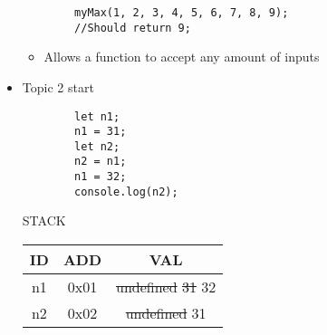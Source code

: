 \documentclass{article}
\begin{document}
\begin{itemize}
\begin{lstlisting}
        myMax(1, 2, 3, 4, 5, 6, 7, 8, 9);
        //Should return 9;
    \end{lstlisting}
    \begin{itemize}
        \item Allows a function to accept any amount of inputs
    \end{itemize}
    \item Topic 2 start
    \begin{lstlisting}
        let n1;
        n1 = 31;
        let n2;
        n2 = n1;
        n1 = 32;
        console.log(n2);
    \end{lstlisting}
    \begin{center}
        STACK
    \begin{tabular}{|c|c|c|}
        \hline ID & ADD & VAL  \\
        \hline\hline
        n1 & 0x01 & \st{undefined} \st{31} 32 \\
        n2 & 0x02 & \st{undefined} 31 \\
        \hline    
    \end{tabular}
    \end{center}
\end{itemize}

\pagebreak
\end{document}
